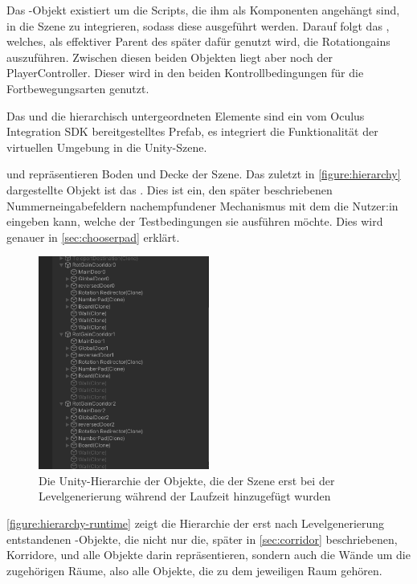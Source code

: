 Das -Objekt existiert um die Scripts, die ihm als Komponenten angehängt sind, in die Szene zu integrieren, sodass diese ausgeführt werden. Darauf folgt das , welches, als effektiver Parent des  später dafür genutzt wird, die Rotationgains auszuführen. Zwischen diesen beiden Objekten liegt aber noch der PlayerController. Dieser wird in den beiden Kontrollbedingungen für die Fortbewegungsarten genutzt.

Das  und die hierarchisch untergeordneten Elemente sind ein vom Oculus Integration SDK bereitgestelltes Prefab, es integriert die Funktionalität der virtuellen Umgebung in die Unity-Szene.

 und  repräsentieren Boden und Decke der Szene. Das zuletzt in \autoref{figure:hierarchy} dargestellte Objekt ist das . Dies ist ein, den später beschriebenen Nummerneingabefeldern nachempfundener Mechanismus mit dem die Nutzer:in eingeben kann, welche der Testbedingungen sie ausführen möchte. Dies wird genauer in \autoref{sec:chooserpad} erklärt.

\begin{figure}[!h]
    \centering
    \includegraphics[width=0.5\textwidth]{images/hierarchy_runtime.png}
    \caption{Die Unity-Hierarchie der Objekte, die der Szene erst bei der Levelgenerierung während der Laufzeit hinzugefügt wurden}\label{figure:hierarchy-runtime}
\end{figure}
\autoref{figure:hierarchy-runtime} zeigt die Hierarchie der erst nach Levelgenerierung entstandenen -Objekte, die nicht nur die, später in \autoref{sec:corridor} beschriebenen, Korridore, und alle Objekte darin repräsentieren, sondern auch die Wände um die zugehörigen Räume, also alle Objekte, die zu dem jeweiligen Raum gehören.

